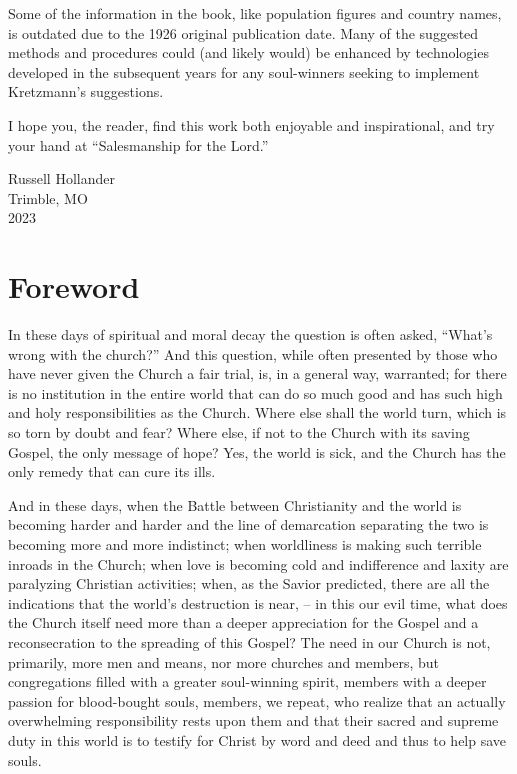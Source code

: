 \documentclass[
]{book}
\begin{document}
Some of the information in the book, like population figures and country names, is outdated due to the 1926 original publication date. Many of the suggested methods and procedures could (and likely would) be enhanced by technologies developed in the subsequent years for any soul-winners seeking to implement Kretzmann's suggestions.

I hope you, the reader, find this work both enjoyable and inspirational, and try your hand at ``Salesmanship for the Lord.''

\hfill\break
Russell Hollander\\
Trimble, MO\\
2023

\chapter*{Foreword}\label{foreword}

In these days of spiritual and moral decay the question is often asked, ``What's wrong with the church?'' And this question, while often presented by those who have never given the Church a fair trial, is, in a general way, warranted; for there is no institution in the entire world that can do so much good and has such high and holy responsibilities as the Church. Where else shall the world turn, which is so torn by doubt and fear? Where else, if not to the Church with its saving Gospel, the only message of hope? Yes, the world is sick, and the Church has the only remedy that can cure its ills.

And in these days, when the Battle between Christianity and the world is becoming harder and harder and the line of demarcation separating the two is becoming more and more indistinct; when worldliness is making such terrible inroads in the Church; when love is becoming cold and indifference and laxity are paralyzing Christian activities; when, as the Savior predicted, there are all the indications that the world's destruction is near, -- in this our evil time, what does the Church itself need more than a deeper appreciation for the Gospel and a reconsecration to the spreading of this Gospel? The need in our Church is not, primarily, more men and means, nor more churches and members, but congregations filled with a greater soul-winning spirit, members with a deeper passion for blood-bought souls, members, we repeat, who realize that an actually overwhelming responsibility rests upon them and that their sacred and supreme duty in this world is to testify for Christ by word and deed and thus to help save souls.
\end{document}
